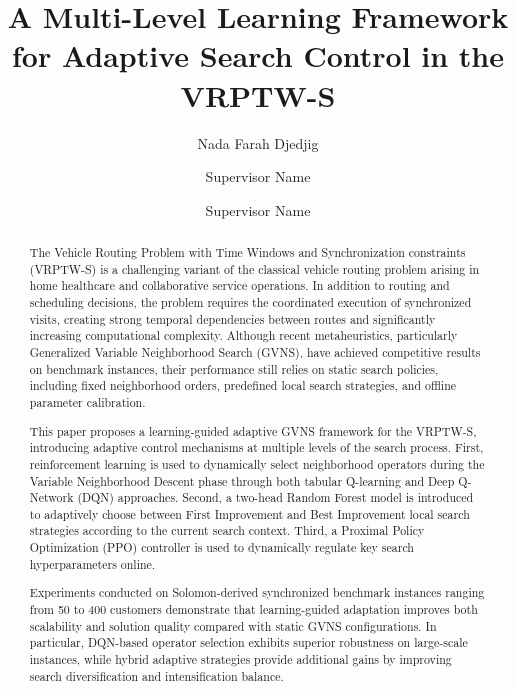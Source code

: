 \documentclass[preprint,12pt]{elsarticle}
\begin{document}
\begin{frontmatter}

\title{ A Multi-Level Learning Framework for Adaptive Search Control in the VRPTW-S }

\author[1]{Nada Farah Djedjig}

\author[1]{Supervisor Name}

\author[1]{Supervisor Name}

\address[1]{Department of Computer Science, University Name, City, Country}

\begin{abstract}
\noindent
The Vehicle Routing Problem with Time Windows and Synchronization constraints (VRPTW-S) is a challenging variant of the classical vehicle routing problem arising in home healthcare and collaborative service operations. In addition to routing and scheduling decisions, the problem requires the coordinated execution of synchronized visits, creating strong temporal dependencies between routes and significantly increasing computational complexity. Although recent metaheuristics, particularly Generalized Variable Neighborhood Search (GVNS), have achieved competitive results on benchmark instances, their performance still relies on static search policies, including fixed neighborhood orders, predefined local search strategies, and offline parameter calibration.

This paper proposes a learning-guided adaptive GVNS framework for the VRPTW-S, introducing adaptive control mechanisms at multiple levels of the search process. First, reinforcement learning is used to dynamically select neighborhood operators during the Variable Neighborhood Descent phase through both tabular Q-learning and Deep Q-Network (DQN) approaches. Second, a two-head Random Forest model is introduced to adaptively choose between First Improvement and Best Improvement local search strategies according to the current search context. Third, a Proximal Policy Optimization (PPO) controller is used to dynamically regulate key search hyperparameters online.

Experiments conducted on Solomon-derived synchronized benchmark instances ranging from 50 to 400 customers demonstrate that learning-guided adaptation improves both scalability and solution quality compared with static GVNS configurations. In particular, DQN-based operator selection exhibits superior robustness on large-scale instances, while hybrid adaptive strategies provide additional gains by improving search diversification and intensification balance.
\end{abstract}



\end{frontmatter}
\end{document}

